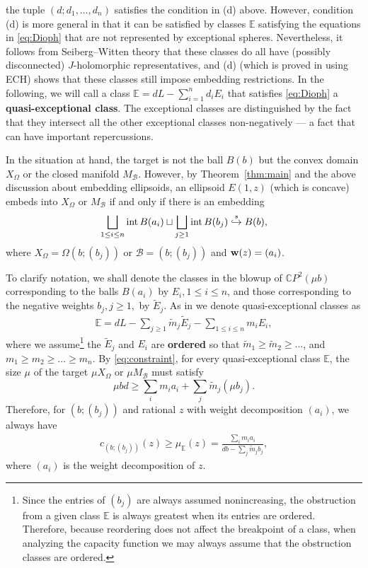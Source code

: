 \documentclass[11pt, reqno]{amsart}
\theoremstyle{remark}
\numberwithin{equation}{subsection}
\numberwithin{figure}{section}
\theoremstyle{customremark}
\newcommand{\se}{{\stackrel{s}\hookrightarrow}}
\newcommand{\bw}{{\bf w}}
\newcommand{\TE}{{\widetilde E}}
\newcommand{\Tm}{{\widetilde m}}
\newcommand{\intt}{{\rm int}}
\newcommand{\bE}{{\mathbb E}}
\newcommand{\Om}{{\Omega}}
\newcommand{\MS}{{\medskip}}
\newcommand{\C}{\mathbb{C}}
\begin{document}
 the tuple $(d;d_1,\dots,d_n)$ satisfies the condition in (d) above. However, condition (d) is more general in that it can be satisfied by classes $\bE$ satisfying the equations in \eqref{eq:Dioph} that are not represented by exceptional spheres. Nevertheless, it follows from Seiberg--Witten theory that these classes do all have (possibly disconnected) $J$-holomorphic representatives, and (d) (which is proved in \cite{Hutchq} using ECH) shows that these classes still impose embedding restrictions. 
In the following, we will call a class $\bE=dL-\sum_{i=1}^n d_i E_i$ that satisfies \eqref{eq:Dioph} a {\bf quasi-exceptional class}.
The exceptional classes are distinguished by the fact that they intersect all the other exceptional classes non-negatively --- a fact that can have important repercussions.
\MS


In the situation at hand, the target is not the ball $B(b)$ but the convex domain $X_\Om$ or the closed manifold $M_{\mathcal{B}}$.  However, by Theorem~\ref{thm:main} and the above discussion about embedding ellipsoids,
 an ellipsoid $E(1,z)$ (which is concave) embeds into $X_\Om$ or $M_{\mathcal{B}}$ if and only if there is an embedding 
$$
 \bigsqcup_{1\le i\le n}\intt\, B(a_i) \sqcup \bigsqcup_{j\ge 1}\intt\, B(b_j) \;\se \; B(b),
$$
where $X_\Om = \Om(b; (b_j))$ or $\mathcal{B}=(b;(b_j))$ and $\bw(z) = (a_i)$. 


To clarify notation,  we shall denote the classes in the blowup of $\C P^2(\mu b)$ corresponding to the balls $B(a_i)$ by $E_i, 1\le i 
\le n$, and those corresponding to the negative weights $b_j, j\ge 1,$ by  $\TE_j$.
As in \cite{AADT} we denote quasi-exceptional classes as
\begin{align}\label{eq:E}  
\bE = dL  - \sum_{j\ge 1}\Tm_j \TE_j - \sum_{1\le i\le n} m_i E_i,
\end{align}
 where we assume\footnote
 {
 Since the entries of $(b_j)$ are always assumed nonincreasing, the obstruction from a given class $\bE$ is always greatest when 
 its entries are ordered. Therefore, because reordering does not affect the breakpoint of a class, when analyzing the capacity function we may always assume that the obstruction classes are ordered.}
    the $\TE_j$ and $E_i$ are {\bf ordered} so that $\Tm_1\ge \Tm_2\ge\dots$, and $m_1\ge m_2 \ge \dots \ge m_n$.
By \eqref{eq:constraint}, for every quasi-exceptional class $\bE$,  the size $\mu$ of the target 
$\mu X_\Om$ or $\mu M_{\mathcal{B}}$ must satisfy
$$
\mu b d \ge \sum_i m_ia_i + \sum_j \Tm_j (\mu b_j).
$$
Therefore, for $(b;(b_j))$ and rational $z$ with weight decomposition $(a_i)$, we always have
\begin{align}\label{eq:mu}  
c_{(b;(b_j))}(z)\ge  \mu_{\bE}(z) = \frac{\sum_i m_ia_i }{db - \sum_j \Tm_j b_j}, 
\end{align}
where $(a_i)$ is the weight decomposition of $z$.
\MS
\end{document}

